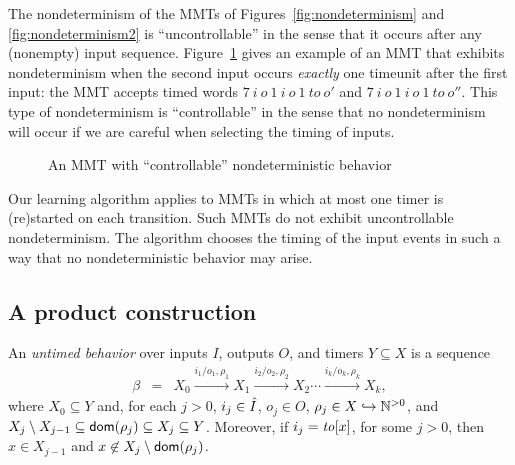 The nondeterminism of the MMTs of Figures~\ref{fig:nondeterminism} and \ref{fig:nondeterminism2} is ``uncontrollable'' in the
sense that it occurs after any (nonempty) input sequence.
Figure~\ref{fig:nondeterminism3} gives an example of an MMT that exhibits nondeterminism when the second input occurs \emph{exactly} one timeunit after the first input: the MMT accepts timed words
$7 ~ i ~ o ~ 1 ~ i ~ o ~ 1 ~ \mathit{to} ~ o'$ and $7 ~ i ~ o ~ 1 ~ i ~ o ~ 1 ~ \mathit{to} ~ o''$.
This type of nondeterminism is ``controllable'' in the sense that no nondeterminism will occur if we are careful
when selecting the timing of inputs.
\begin{figure}[ht]
\begin{center}
\caption{An MMT with ``controllable'' nondeterministic behavior}
\label{fig:nondeterminism3}
\end{center}
\end{figure}
Our learning algorithm applies to MMTs in which at most one timer is (re)started on each transition. Such MMTs do not
exhibit uncontrollable nondeterminism. The algorithm chooses the timing of the input events in such a way that no
nondeterministic behavior may arise.


\subsection{A product construction}
An \emph{untimed behavior} over inputs $I$, outputs $O$, and timers $Y \subseteq X$ is a sequence 
\begin{eqnarray*}
\beta & = & X_0 \xrightarrow{i_1/o_1, \rho_1} X_1  \xrightarrow{i_2/o_2, \rho_2} X_2 \cdots \xrightarrow{i_k/o_k, \rho_k} X_{k},
\end{eqnarray*}
where $X_0 \subseteq Y$ and, for each $j>0$,  $i_j \in \hat{I}$, $o_j \in O$, $\rho_j \in X \hookrightarrow {\mathbb N}^{>0}$, and
 $X_j \setminus X_{j-1}  \subseteq {\textsf{dom}}(\rho_j) \subseteq X_j \subseteq Y$.
Moreover, if $i_j = \mathit{to}[x]$, for some $j>0$, then $x \in X_{j-1}$ and $x \not\in X_j \setminus {\textsf{dom}}(\rho_j)$.

